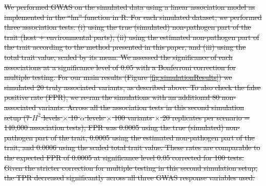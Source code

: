 \documentclass[12pt]{article} %
\providecommand{\DIFdel}[1]{{\protect\color{red}\sout{#1}}}                      %
\providecommand{\DIFdelbegin}{} %
\newcommand{\DIFscaledelfig}{0.5}
\newlength{\DIFdelgraphicswidth} %
\newlength{\DIFdelgraphicsheight} %
\newcommand{\DIFdelincludegraphics}[2][]{%
\sbox{\DIFdelgraphicsbox}{\DIFOincludegraphics[#1]{#2}}%
\settoboxwidth{\DIFdelgraphicswidth}{\DIFdelgraphicsbox} %
\settoboxtotalheight{\DIFdelgraphicsheight}{\DIFdelgraphicsbox} %
\scalebox{\DIFscaledelfig}{%
\parbox[b]{\DIFdelgraphicswidth}{\usebox{\DIFdelgraphicsbox}\\[-\baselineskip] \rule{\DIFdelgraphicswidth}{0em}}\llap{\resizebox{\DIFdelgraphicswidth}{\DIFdelgraphicsheight}{%
\setlength{\unitlength}{\DIFdelgraphicswidth}%
\begin{picture}(1,1)%
\thicklines\linethickness{2pt} %
{\color[rgb]{1,0,0}\put(0,0){\framebox(1,1){}}}%
{\color[rgb]{1,0,0}\put(0,0){\line( 1,1){1}}}%
{\color[rgb]{1,0,0}\put(0,1){\line(1,-1){1}}}%
\end{picture}%
}\hspace*{3pt}}} %
} %
\DeclareRobustCommand{\DIFdelbegin}{\DIFOdelbegin \let\includegraphics\DIFdelincludegraphics} %
\begin{document}
\begin{doublespace}
\DIFdelbegin \DIFdel{We performed GWAS on the simulated data using a linear association model as implemented in the ``lm'' function in R. For each simulated dataset, we performed three association tests: (i) using the true (simulated) non-pathogen part of the trait (host + environmental parts), (ii) using the estimated non-pathogen part of the trait according to the method presented in this paper, and (iii) using the total trait value, scaled by its mean. We assessed the significance of each associations at a significance level of 0.05 with a Bonferroni correction for multiple testing. For our main results (Figure \ref{fig:simulationResults}) we simulated 20 truly associated variants, as described above. To also check the false positive rate (FPR), we re-ran the simulations with an additional 80 non-associated variants. Across all the association tests in this second simulation setup (7 $H^2$ levels $\times$ 10 $\alpha$ levels $\times$ 100 variants $\times$ 20 replicates per scenario = 140,000 association tests), FPR was 0.0005 using the true (simulated) non-pathogen part of the trait, 0.0005  using the estimated non-pathogen part of the trait, and 0.0006 using the scaled total trait value. These rates are comparable to the expected FPR of 0.0005 at significance level 0.05 corrected for 100 tests. Given the stricter correction for multiple testing in this second simulation setup, the TPR decreased significantly across all three GWAS response variables used.
}%


\end{doublespace}
\end{document}
